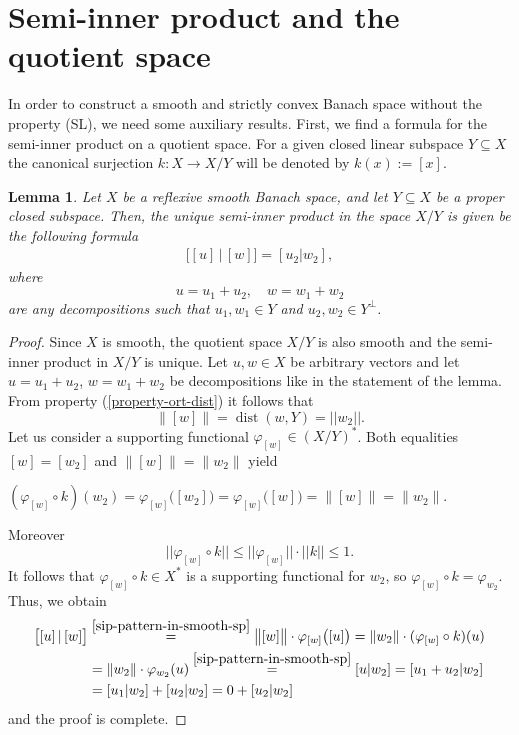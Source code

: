 \documentclass[12pt, reqno]{amsart}
\newtheorem{lemma}[theorem]{Lemma}
\theoremstyle{definition}
\theoremstyle{remark}
\numberwithin{equation}{section}
\newcommand{\fii}{\varphi}
\newcommand{\sip}[2]{\left[#1|#2\right]}
\DeclareMathOperator{\dist}{dist}
\begin{document}
\section{Semi-inner product and the quotient space}
\label{sectionquotient}
\setcounter{equation}{0}
In order to construct a smooth and strictly convex Banach space without the property (SL), we need some auxiliary results. First, we find a formula for the semi-inner product on a quotient space. For a given closed linear subspace $Y \subseteq X$ the canonical surjection $k:X \to X/Y$ will be denoted by $k(x):=[x]$.
\begin{lemma}
\label{sipquotient}
Let $X$ be a reflexive smooth Banach space, and let $Y\subseteq X$ be a proper closed subspace. Then, the unique semi-inner product in the space $X/Y$ is given be the following formula
\begin{align}\label{sip-in-quotient-sp}
 \big[ [u]\, |\, [w]\big]=\sip{u_2}{w_2},
\end{align}
where
$$u=u_1 + u_2, \quad w = w_1 + w_2$$
are any decompositions such that $u_1, w_1 \in Y$ and $u_2, w_2 \in Y^{\perp}$.
\end{lemma}
\begin{proof}
Since $X$ is smooth, the quotient space $X/Y$ is also smooth and the semi-inner product in $X/Y$ is unique. Let $u, w \in X$ be arbitrary vectors and let $u=u_1 + u_2$, $w=w_1+w_2$ be decompositions like in the statement of the lemma. From property (\ref{property-ort-dist}) it follows that
$$\big\|[w]\big\|=\dist(w, Y)=||w_2||.$$
Let us consider a supporting functional $\fii_{[w]}\in (X/Y)^*$.
Both equalities $[w]=[w_2]$ and $\big\| [w]\big\|=\|w_2\|$ yield
\begin{center}
$(\fii_{[w]}\circ k)(w_2)=\fii_{[w]}\big([w_2]\big)=\fii_{[w]}\big([w]\big)=\big\| [w]\big\|=\|w_2\|$.
\end{center}
Moreover
$$||\fii_{[w]}\circ k || \leq ||\fii_{[w]}|| \cdot ||k|| \leq 1.$$
It follows that $\fii_{[w]}\circ k\in X^*$ is a supporting functional for $w_2$, so $\fii_{[w]}\circ k=\fii_{w_2}$.
Thus, we obtain
\begin{align*}
\big[ [u]\, |\, [w]\big]&\stackrel{\eqref{sip-pattern-in-smooth-sp}}{=}\big\| [w]\big\|\cdot \fii_{[w]}\big([u] \big)=\|w_2\|\cdot (\fii_{[w]}\circ k)(u)\\
&=\|w_2\|\cdot \fii_{w_2}(u)\stackrel{\eqref{sip-pattern-in-smooth-sp}}{=}\sip{u}{w_2}=\sip{u_1+u_2}{w_2}\\
&=\sip{u_1}{w_2}+\sip{u_2}{w_2}=0+\sip{u_2}{w_2}
\end{align*}
and the proof is complete.
\end{proof}
\end{document}
